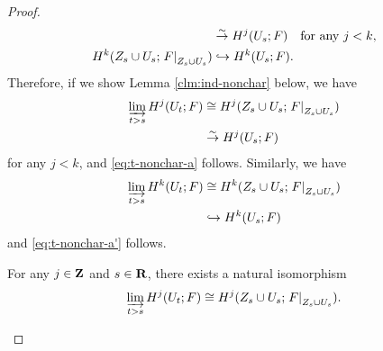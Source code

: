 \begin{proof}
\begin{align}
    &\simar
    H^{j}(U_{s};F)\quad
    \text{for any \(j< k\),}\\
    \label{eq:a-inj}H^{k}(Z_{s}\cup U_{s};\mres[F]{Z_{s}\cup U_{s}})
    &\hookrightarrow
    H^{k}(U_{s};F).
  \end{align}
  Therefore, if we show Lemma \ref{clm:ind-nonchar} below, 
  we have 
  \begin{align*}
    \indlim[t>s]H^{j}(U_t;F)
    &\cong 
    H^{j}(Z_{s}\cup U_{s};\mres[F]{Z_{s}\cup U_{s}})\\
    &\simar
    H^{j}(U_s;F)
  \end{align*}
  for any \(j<k\), and \ref{eq:t-nonchar-a} follows. 
  Similarly, 
  we have
  \begin{align*}
    \indlim[t>s]H^{k}(U_t;F)
    &\cong 
    H^{k}(Z_{s}\cup U_{s};\mres[F]{Z_{s}\cup U_{s}})\\
    &\hookrightarrow
    H^{k}(U_s;F)
  \end{align*}
  and \ref{eq:t-nonchar-a'} follows. 
  \begin{Lemma+}\label{clm:ind-nonchar}
    For any \(j\in\zz\) and \(s\in\rr\), there exists a natural isomorphism 
    \[
      \indlim[t>s]H^{j}(U_t;F)
      \cong 
      H^{j}(Z_{s}\cup U_{s};\mres[F]{Z_{s}\cup U_{s}}).
    \]
  \end{Lemma+}


\end{proof}
